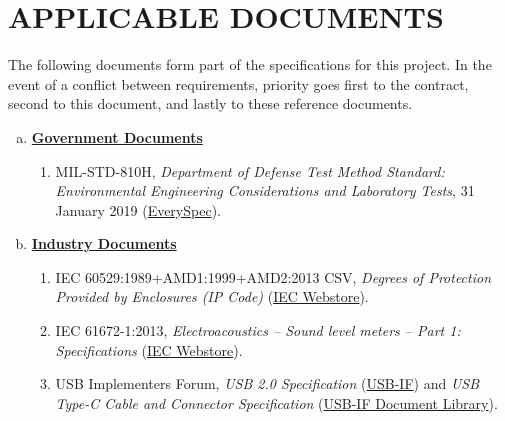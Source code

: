 \section{APPLICABLE DOCUMENTS}

The following documents form part of the specifications for this project.  In the event of a conflict between requirements, priority goes first to the contract, second to this document, and lastly to these reference documents.

\begin{enumerate}[(a)]
	\item \textbf{\underline{Government Documents}}
		\begin{enumerate}[1.]
			\item MIL-STD-810H, \textit{Department of Defense Test Method Standard: Environmental Engineering Considerations and Laboratory Tests}, 31 January 2019 (\href{https://everyspec.com/MIL-STD/MIL-STD-0800-0899/MIL-STD-810H_55998/}{EverySpec}).
		\end{enumerate}
	\item \textbf{\underline{Industry Documents}}
		\begin{enumerate}[1.]
			\item IEC 60529:1989+AMD1:1999+AMD2:2013 CSV, \textit{Degrees of Protection Provided by Enclosures (IP Code)} (\href{https://webstore.iec.ch/en/publication/2452}{IEC Webstore}).
			\item IEC 61672-1:2013, \textit{Electroacoustics -- Sound level meters -- Part 1: Specifications} (\href{https://webstore.iec.ch/en/publication/5708}{IEC Webstore}).
			\item USB Implementers Forum, \textit{USB 2.0 Specification} (\href{https://www.usb.org/document-library/usb-20-specification}{USB-IF}) and \textit{USB Type-C Cable and Connector Specification} (\href{https://www.usb.org/document-library}{USB-IF Document Library}).
		\end{enumerate}
\end{enumerate}
